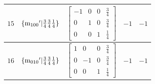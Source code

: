 \documentclass[fleqn,8pt]{jsarticle}
\begin{document}
\begin{longtable}{ccccc}
$ 15 $ & $ \{{\rm m}_{100}{}'|\frac{3}{4} \frac{3}{4} \frac{1}{4}\} $ & $ \begin{bmatrix} -1 & 0 & 0 & \frac{3}{4} \\ 0 & 1 & 0 & \frac{3}{4} \\ 0 & 0 & 1 & \frac{1}{4} \end{bmatrix} $ & $ -1 $ & $ -1 $ \\ \hline
$ 16 $ & $ \{{\rm m}_{010}{}'|\frac{3}{4} \frac{3}{4} \frac{1}{4}\} $ & $ \begin{bmatrix} 1 & 0 & 0 & \frac{3}{4} \\ 0 & -1 & 0 & \frac{3}{4} \\ 0 & 0 & 1 & \frac{1}{4} \end{bmatrix} $ & $ -1 $ & $ -1 $ \\
\end{longtable}
\end{document}
